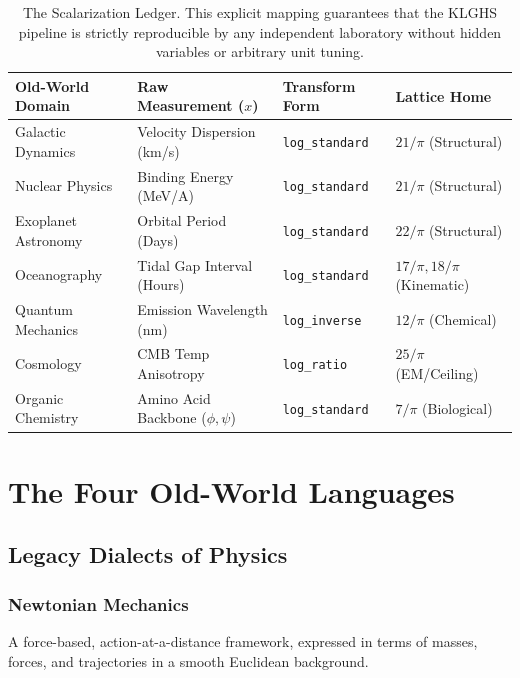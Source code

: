 \documentclass[12pt,oneside]{book}
\begin{document}
\begin{table}[H]
\centering
\renewcommand{\arraystretch}{1.4}
\small
\begin{tabular}{|l|l|l|l|}
\hline
\rowcolor{blue!10}
\textbf{Old-World Domain} & \textbf{Raw Measurement ($x$)} & \textbf{Transform Form} & \textbf{Lattice Home} \\
\hline\hline
Galactic Dynamics & Velocity Dispersion (km/s) & \texttt{log\_standard} & $21/\pi$ (Structural) \\
Nuclear Physics & Binding Energy (MeV/A) & \texttt{log\_standard} & $21/\pi$ (Structural) \\
Exoplanet Astronomy & Orbital Period (Days) & \texttt{log\_standard} & $22/\pi$ (Structural) \\
Oceanography & Tidal Gap Interval (Hours) & \texttt{log\_standard} & $17/\pi, 18/\pi$ (Kinematic) \\
Quantum Mechanics & Emission Wavelength (nm) & \texttt{log\_inverse} & $12/\pi$ (Chemical) \\
Cosmology & CMB Temp Anisotropy & \texttt{log\_ratio} & $25/\pi$ (EM/Ceiling) \\
Organic Chemistry & Amino Acid Backbone ($\phi, \psi$) & \texttt{log\_standard} & $7/\pi$ (Biological) \\
\hline
\end{tabular}
\caption{The Scalarization Ledger. This explicit mapping guarantees that the KLGHS pipeline is strictly reproducible by any independent laboratory without hidden variables or arbitrary unit tuning.}
\label{tab:scalarization_ledger}
\end{table}


\part{The Four Old-World Languages}

\chapter{Legacy Dialects of Physics}

\section{Newtonian Mechanics}
A force-based, action-at-a-distance framework, expressed in terms of masses,
forces, and trajectories in a smooth Euclidean background.
\end{document}
